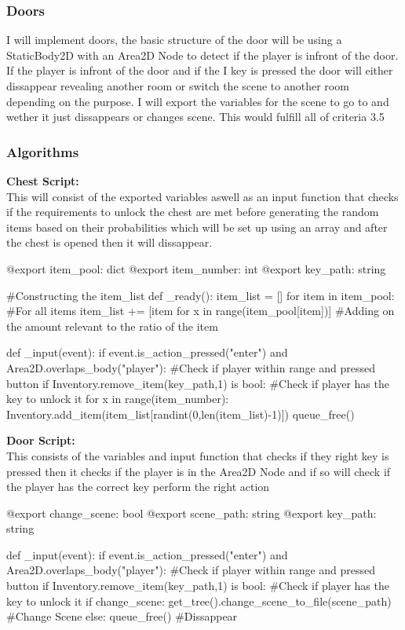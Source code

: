 \documentclass{article}
\begin{document}
        \subsubsection{Doors}
        I will implement doors, the basic structure of the door will be using a StaticBody2D with an Area2D Node to detect if the player is infront of the door. If the player is infront of the door and if the I key is pressed the door will either dissappear revealing another room or switch the scene to another room depending on the purpose. I will export the variables for the scene to go to and wether it just dissappears or changes scene. This would fulfill all of criteria 3.5\\
        \subsubsection{Algorithms}
        \textbf{Chest Script:}\\
        This will consist of the exported variables aswell as an input function that checks if the requirements to unlock the chest are met before generating the random items based on their probabilities which will be set up using an array and after the chest is opened then it will dissappear.\\
        \begin{python}
@export item_pool: dict
@export item_number: int
@export key_path: string

#Constructing the item_list
def _ready():
   item_list = []
   for item in item_pool: #For all items
     item_list += [item for x in range(item_pool[item])] #Adding on the amount relevant to the ratio of the item

def _input(event):
   if event.is_action_pressed("enter") and Area2D.overlaps_body("player"): #Check if player within range and pressed button
      if Inventory.remove_item(key_path,1) is bool: #Check if player has the key to unlock it 
         for x in range(item_number):
            Inventory.add_item(item_list[randint(0,len(item_list)-1)])
        queue_free()
   
        \end{python}
        \textbf{Door Script:}\\
        This consists of the variables and input function that checks if they right key is pressed then it checks if the player is in the Area2D Node and if so will check if the player has the correct key perform the right action\\
        \begin{python}
@export change_scene: bool
@export scene_path: string
@export key_path: string

def _input(event):
   if event.is_action_pressed("enter") and Area2D.overlaps_body("player"): #Check if player within range and pressed button
      if Inventory.remove_item(key_path,1) is bool: #Check if player has the key to unlock it 
         if change_scene:
            get_tree().change_scene_to_file(scene_path) #Change Scene
         else:
            queue_free() #Dissappear
        \end{python}
\end{document}
